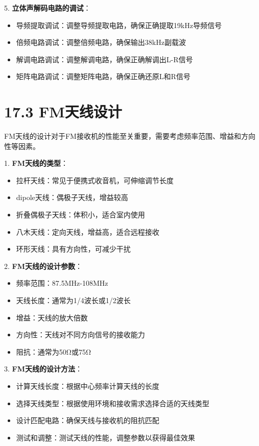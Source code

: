\documentclass[12pt,UTF8]{ctexbook}
\begin{document}
5. \textbf{立体声解码电路的调试}：
   \begin{itemize}[leftmargin=3.5em]
   \item 导频提取调试：调整导频提取电路，确保正确提取19kHz导频信号
   \item 倍频电路调试：调整倍频电路，确保输出38kHz副载波
   \item 解调电路调试：调整解调电路，确保正确解调出L-R信号
   \item 矩阵电路调试：调整矩阵电路，确保正确还原L和R信号
   \end{itemize}

\section*{17.3 FM天线设计}

FM天线的设计对于FM接收机的性能至关重要，需要考虑频率范围、增益和方向性等因素。

1. \textbf{FM天线的类型}：
   \begin{itemize}[leftmargin=3.5em]
   \item 拉杆天线：常见于便携式收音机，可伸缩调节长度
   \item dipole天线：偶极子天线，增益较高
   \item 折叠偶极子天线：体积小，适合室内使用
   \item 八木天线：定向天线，增益高，适合远程接收
   \item 环形天线：具有方向性，可减少干扰
   \end{itemize}

2. \textbf{FM天线的设计参数}：
   \begin{itemize}[leftmargin=3.5em]
   \item 频率范围：87.5MHz-108MHz
   \item 天线长度：通常为1/4波长或1/2波长
   \item 增益：天线的放大倍数
   \item 方向性：天线对不同方向信号的接收能力
   \item 阻抗：通常为50Ω或75Ω
   \end{itemize}

3. \textbf{FM天线的设计方法}：
   \begin{itemize}[leftmargin=3.5em]
   \item 计算天线长度：根据中心频率计算天线的长度
   \item 选择天线类型：根据使用环境和接收需求选择合适的天线类型
   \item 设计匹配电路：确保天线与接收机的阻抗匹配
   \item 测试和调整：测试天线的性能，调整参数以获得最佳效果
   \end{itemize}
\end{document}
